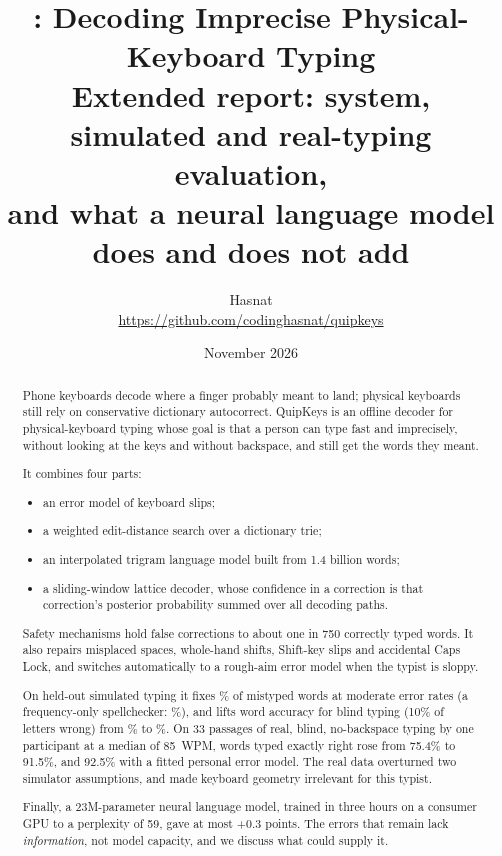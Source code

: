 \documentclass[11pt,a4paper]{article}
\title{\qk: Decoding Imprecise Physical-Keyboard Typing\\[4pt]\large Extended report: system, simulated and real-typing evaluation,\\and what a neural language model does and does not add}
\author{Hasnat\\[2pt]\small\url{https://github.com/codinghasnat/quipkeys}}
\date{November 2026}
\newcommand{\qk}{QuipKeys}
\begin{document}
\maketitle

\begin{abstract}
Phone keyboards decode where a finger probably meant to land; physical keyboards still rely on conservative dictionary autocorrect. \qk{} is an offline decoder for physical-keyboard typing whose goal is that a person can type fast and imprecisely, without looking at the keys and without backspace, and still get the words they meant.

It combines four parts:
\begin{itemize}[leftmargin=1.2em]
\item an error model of keyboard slips;
\item a weighted edit-distance search over a dictionary trie;
\item an interpolated trigram language model built from 1.4 billion words;
\item a sliding-window lattice decoder, whose confidence in a correction is that correction's posterior probability summed over all decoding paths.
\end{itemize}
Safety mechanisms hold false corrections to about one in 750 correctly typed words. It also repairs misplaced spaces, whole-hand shifts, Shift-key slips and accidental Caps Lock, and switches automatically to a rough-aim error model when the typist is sloppy.

On held-out simulated typing it fixes \ModFix\% of mistyped words at moderate error rates (a frequency-only spellchecker: \ModFixPlain\%), and lifts word accuracy for blind typing (10\% of letters wrong) from \BlindNone\% to \BlindAcc\%. On 33 passages of real, blind, no-backspace typing by one participant at a median of 85~WPM, words typed exactly right rose from 75.4\% to 91.5\%, and 92.5\% with a fitted personal error model. The real data overturned two simulator assumptions, and made keyboard geometry irrelevant for this typist.

Finally, a 23M-parameter neural language model, trained in three hours on a consumer GPU to a perplexity of 59, gave at most +0.3 points. The errors that remain lack \emph{information}, not model capacity, and we discuss what could supply it.
\end{abstract}

\tableofcontents
\bigskip

\end{document}
